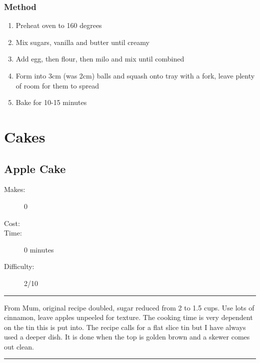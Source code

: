 \documentclass[]{article}
\begin{document}
\subsubsection*{\Large Method}
\begin{enumerate}[font=\huge\color{accent}]
	\item Preheat oven to 160 degrees
	\item Mix sugars, vanilla and butter until creamy
	\item Add egg, then flour, then milo and mix until combined
	\item Form into 3cm (was 2cm) balls and squash onto tray with a fork, leave plenty of room for them to spread
	\item Bake for 10-15 minutes
\end{enumerate}
\newpage
{}
\section*{\center\Huge\color{accent}Cakes}
\label{cat:Cakes}
\label{rec:Apple Cake}
\subsection*{\center\huge Apple Cake}
\begin{description}
\item[Makes:] 0 
\item[Cost:] \textdollar
\item[Time:] 0 minutes
\item[Difficulty:] 2/10
\end{description}
\vspace{0.2cm}\hrule\vspace{0.5cm}
\begin{adjustwidth}{0.5 cm}{0.5 cm}

From Mum, original recipe doubled, sugar reduced from 2 to 1.5 cups. Use lots of cinnamon, leave apples unpeeled for texture. The cooking time is very dependent on the tin this is put into. The recipe calls for a flat slice tin but I have always used a deeper dish. It is done when the top is golden brown and a skewer comes out clean. \hfill\color{accent}{\Large\faVimeoSquare\hspace{0.1cm}\faTruck\hspace{0.1cm}}\color{black}

\end{adjustwidth}
\vspace{0.5cm}\hrule
\end{document}
